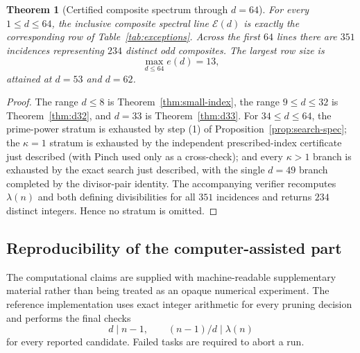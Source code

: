 \documentclass[11pt]{article}
\newtheorem{theorem}{Theorem}[section]
\newcommand{\Eset}{\mathcal E}
\begin{document}
\begin{theorem}[Certified composite spectrum through $d=64$]
\label{thm:d64}
For every $1\le d\le64$, the inclusive composite spectral line $\Eset(d)$ is
exactly the corresponding row of Table~\ref{tab:exceptions}.  Across the
first $64$ lines there are $351$ incidences representing $234$ distinct odd
composites.  The largest row size is
\[
\max_{d\le64} e(d)=13,
\]
attained at $d=53$ and $d=62$.
\end{theorem}

\begin{proof}
The range $d\le8$ is Theorem~\ref{thm:small-index}, the range $9\le d\le32$
is Theorem~\ref{thm:d32}, and $d=33$ is Theorem~\ref{thm:d33}.  For
$34\le d\le64$, the prime-power stratum is exhausted by step (1) of
Proposition~\ref{prop:search-spec}; the $\kappa=1$ stratum is exhausted by
the independent prescribed-index certificate just described (with Pinch used
only as a cross-check); and every $\kappa>1$ branch is exhausted by
the exact search just described, with the single $d=49$ branch completed by
the divisor-pair identity.  The accompanying verifier recomputes
$\lambda(n)$ and both defining divisibilities for all $351$ incidences and
returns $234$ distinct integers.  Hence no stratum is omitted.
\end{proof}


\subsection{Reproducibility of the computer-assisted part}
\label{subsec:reproducibility}

The computational claims are supplied with machine-readable supplementary
material rather than being treated as an opaque numerical experiment.  The
reference implementation uses exact integer arithmetic for every pruning
decision and performs the final checks
\[
d\mid n-1,\qquad (n-1)/d\mid\lambda(n)
\]
for every reported candidate.  Failed tasks are required to abort a run.
\end{document}

